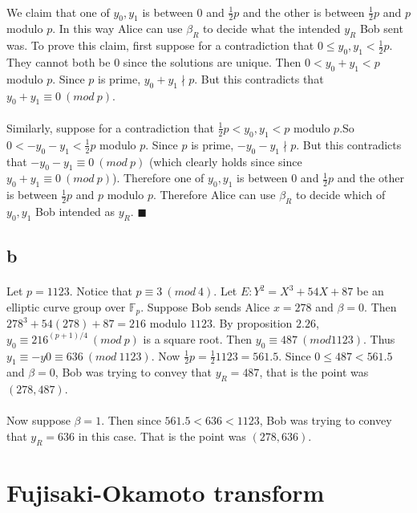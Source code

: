 \documentclass[letterpaper,12pt,oneside,onecolumn]{report}
\begin{document}
\paragraph{}
We claim that one of $y_0,y_1$ is between $0$ and $\frac{1}{2}p$ and the other is between $\frac{1}{2}p$ and $p$ modulo $p$. In this way Alice can use $\beta_R$ to decide what the intended $y_R$ Bob sent was. To prove this claim, first suppose for a contradiction that $0 \leq y_0,y_1 < \frac{1}{2}p$. They cannot both be $0$ since the solutions are unique. Then $0 < y_0 + y_1 < p$ modulo $p$. Since $p$ is prime, $y_0 + y_1 \nmid p$. But this contradicts that $y_0 + y_1 \equiv 0\ (mod\ p)$.
\paragraph{}
Similarly, suppose for a contradiction that $\frac{1}{2}p < y_0,y_1 < p$ modulo $p$.So  $0 < -y_0 -y_1 < \frac{1}{2}p$ modulo $p$. Since $p$ is prime, $-y_0 - y_1 \nmid p$. But this contradicts that $-y_0 -y_1 \equiv 0\ (mod\ p)$ (which clearly holds since since $y_0 + y_1 \equiv 0\ (mod\ p)$). Therefore one of $y_0,y_1$ is between $0$ and $\frac{1}{2}p$ and the other is between $\frac{1}{2}p$ and $p$ modulo $p$. Therefore Alice can use $\beta_R$ to decide which of $y_0,y_1$ Bob intended as $y_R$. $\blacksquare$
\subsection*{b}
\paragraph{}
Let $p = 1123$. Notice that $p \equiv 3\ (mod\ 4)$. Let $E: Y^2 = X^3 + 54X + 87$ be an elliptic curve group over $\mathbb{F}_p$. Suppose Bob sends Alice $x=278$ and $\beta = 0$. Then $278^3 + 54(278) + 87 = 216$ modulo $1123$. By proposition $2.26$, $y_0 \equiv 216^{(p+1)/4}\ (mod\ p)$ is a square root. Then $y_0 \equiv 487\ (mod 1123)$. Thus $y_1 \equiv -y0 \equiv 636\ (mod\ 1123)$. Now $\frac{1}{2}p = \frac{1}{2}1123 = 561.5$. Since $0 \leq 487 < 561.5$ and $\beta = 0$, Bob was trying to convey that $y_R = 487$, that is the point was $(278, 487)$.
\paragraph{}
Now suppose $\beta = 1$. Then since $561.5 < 636 < 1123$, Bob was trying to convey that $y_R = 636$ in this case. That is the point was $(278, 636)$.
\section*{Fujisaki-Okamoto transform}
\end{document}
